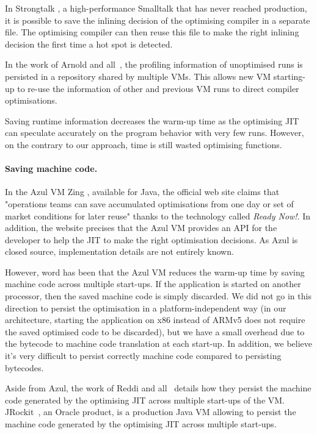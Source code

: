 \documentclass[a4paper,12pt,twoside]{../includes/ThesisStyle}
\begin{document}
In Strongtalk \cite{Sun06}, a high-performance Smalltalk that has never reached production, it is possible to save the inlining decision of the optimising compiler in a separate file. The optimising compiler can then reuse this file to make the right inlining decision the first time a hot spot is detected.

In the work of Arnold and all~\cite{Arno05c}, the profiling information of unoptimised runs is persisted in a repository shared by multiple VMs. This allows new VM starting-up to re-use the information of other and previous VM runs to direct compiler optimisations.

Saving runtime information decreases the warm-up time as the optimising JIT can speculate accurately on the program behavior with very few runs. However, on the contrary to our approach, time is still wasted optimising functions.

\paragraph{Saving machine code.}

In the Azul VM Zing \cite{Azul}, available for Java, the official web site claims that "operations teams can save accumulated optimisations from one day or set of market conditions for later reuse" thanks to the technology called \emph{Ready Now!}. In addition, the website precises that the Azul VM provides an API for the developer to help the JIT to make the right optimisation decisions. As Azul is closed source, implementation details are not entirely known. 

However, word has been that the Azul VM reduces the warm-up time by saving machine code across multiple start-ups. If the application is started on another processor, then the saved machine code is simply discarded. We did not go in this direction to persist the optimisation in a platform-independent way (in our architecture, starting the application on x86 instead of ARMv5 does not require the saved optimised code to be discarded), but we have a small overhead due to the bytecode to machine code translation at each start-up. In addition, we believe it's very difficult to persist correctly machine code compared to persisting bytecodes.

Aside from Azul, the work of Reddi and all~\cite{Redd07a} details how they persist the machine code generated by the optimising JIT across multiple start-ups of the VM. JRockit~\cite{JRockit}, an Oracle product, is a production Java VM allowing to persist the machine code generated by the optimising JIT across multiple start-ups.
\end{document}

